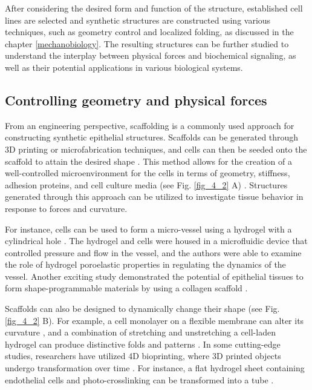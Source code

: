 After considering the desired form and function of the structure, established cell lines are selected and synthetic structures are constructed using various techniques, such as geometry control and localized folding, as discussed in the chapter \ref{mechanobiology}. The resulting structures can be further studied to understand the interplay between physical forces and biochemical signaling, as well as their potential applications in various biological systems.

\hypertarget{controlling-geometry-and-physical-forces}{%
	\subsection{Controlling geometry and physical 		forces}\label{controlling-geometry-and-physical-forces}}

From an engineering perspective, scaffolding is a commonly used approach for constructing synthetic epithelial structures. Scaffolds can be generated through 3D printing or microfabrication techniques, and cells can then be seeded onto the scaffold to attain the desired shape \cite{torras2018}. This method allows for the creation of a well-controlled microenvironment for the cells in terms of geometry, stiffness, adhesion proteins, and cell culture media (see Fig. \ref{fig_4_2} A) . Structures generated through this approach can be utilized to investigate tissue behavior in response to forces and curvature.

For instance, cells can be used to form a micro-vessel using a hydrogel with a cylindrical hole \cite{dessalles2021}. The hydrogel and cells were housed in a microfluidic device that controlled pressure and flow in the vessel, and the authors were able to examine the role of hydrogel poroelastic properties in regulating the dynamics of the vessel. Another exciting study demonstrated the potential of epithelial tissues to form shape-programmable materials by using a collagen scaffold \cite{mailand2022}.

Scaffolds can also be designed to dynamically change their shape (see Fig. \ref{fig_4_2} B). For example, a cell monolayer on a flexible membrane can alter its curvature \cite{blonski2021}, and a combination of stretching and unstretching a cell-laden hydrogel can produce distinctive folds and patterns \cite{chan2018}. In some cutting-edge studies, researchers have utilized 4D bioprinting, where 3D printed objects undergo transformation over time \cite{arif2022}. For instance, a flat hydrogel sheet containing endothelial cells and photo-crosslinking can be transformed into a tube \cite{zhang2020}.


